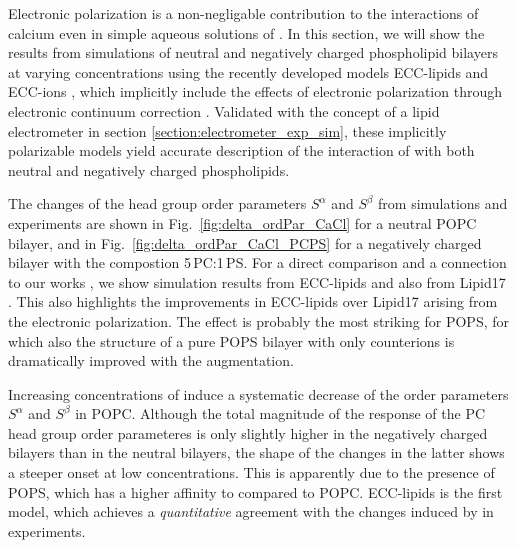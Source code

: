 Electronic polarization is a non-negligable contribution to the interactions of calcium even in simple aqueous solutions of  \citep{martinek17, kohagen16, Pluharova2014}. 
In this section,
we will show the results from simulations of neutral and negatively charged phospholipid bilayers at varying  concentrations
using the recently developed models ECC-lipids and ECC-ions \citep{melcr18, martinek17}, 
which implicitly include the effects of electronic polarization through electronic continuum correction \citep{leontyev11}. 
Validated with the concept of a lipid electrometer in section \ref{section:electrometer_exp_sim},
these implicitly polarizable models yield accurate description of 
the interaction of  with both neutral and negatively charged phospholipids. 

The changes of the head group order parameters $S^\alpha$ and $S^\beta$ from simulations and experiments 
are shown in Fig.~\ref{fig:delta_ordPar_CaCl} for a neutral POPC bilayer, 
and in Fig.~\ref{fig:delta_ordPar_CaCl_PCPS} for a negatively charged bilayer with the compostion 5\,PC:1\,PS. 
For a direct comparison and a connection to our works \citep{catte16, nmrlipids_proj4},
we show simulation results from ECC-lipids and also from Lipid17 \citep{lipid17-future}. 
This also highlights the improvements in ECC-lipids over Lipid17 arising from the electronic polarization. 
The effect is probably the most striking for POPS, 
for which also the structure of a pure POPS bilayer with only counterions is dramatically improved with the augmentation. 


Increasing concentrations of  induce a systematic decrease of the order parameters $S^\alpha$ and $S^\beta$ in POPC. 
Although the total magnitude of the response of the PC head group order parameteres 
is only slightly higher in the negatively charged bilayers than in the neutral bilayers, 
the shape of the changes in the latter shows a steeper onset at low concentrations. 
This is apparently due to the presence of POPS, 
which has a higher affinity to  compared to POPC. 
ECC-lipids is the first model,
which achieves a \emph{quantitative} agreement with the changes induced by  in experiments. 




